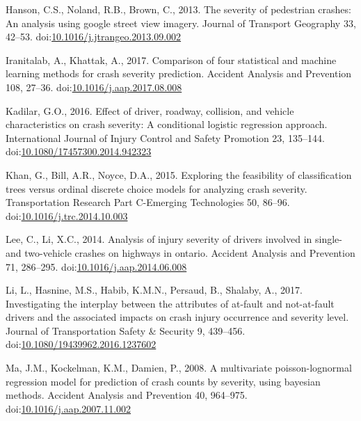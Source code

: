 \documentclass[]{elsarticle} %
\begin{document}
\leavevmode\hypertarget{ref-Hanson2013severity}{}%
Hanson, C.S., Noland, R.B., Brown, C., 2013. The severity of pedestrian
crashes: An analysis using google street view imagery. Journal of
Transport Geography 33, 42--53.
doi:\href{https://doi.org/10.1016/j.jtrangeo.2013.09.002}{10.1016/j.jtrangeo.2013.09.002}

\leavevmode\hypertarget{ref-Iranitalab2017comparison}{}%
Iranitalab, A., Khattak, A., 2017. Comparison of four statistical and
machine learning methods for crash severity prediction. Accident
Analysis and Prevention 108, 27--36.
doi:\href{https://doi.org/10.1016/j.aap.2017.08.008}{10.1016/j.aap.2017.08.008}

\leavevmode\hypertarget{ref-Kadilar2016effect}{}%
Kadilar, G.O., 2016. Effect of driver, roadway, collision, and vehicle
characteristics on crash severity: A conditional logistic regression
approach. International Journal of Injury Control and Safety Promotion
23, 135--144.
doi:\href{https://doi.org/10.1080/17457300.2014.942323}{10.1080/17457300.2014.942323}

\leavevmode\hypertarget{ref-Khan2015exploring}{}%
Khan, G., Bill, A.R., Noyce, D.A., 2015. Exploring the feasibility of
classification trees versus ordinal discrete choice models for analyzing
crash severity. Transportation Research Part C-Emerging Technologies 50,
86--96.
doi:\href{https://doi.org/10.1016/j.trc.2014.10.003}{10.1016/j.trc.2014.10.003}

\leavevmode\hypertarget{ref-Lee2014analysis}{}%
Lee, C., Li, X.C., 2014. Analysis of injury severity of drivers involved
in single- and two-vehicle crashes on highways in ontario. Accident
Analysis and Prevention 71, 286--295.
doi:\href{https://doi.org/10.1016/j.aap.2014.06.008}{10.1016/j.aap.2014.06.008}

\leavevmode\hypertarget{ref-Li2017interplay}{}%
Li, L., Hasnine, M.S., Habib, K.M.N., Persaud, B., Shalaby, A., 2017.
Investigating the interplay between the attributes of at-fault and
not-at-fault drivers and the associated impacts on crash injury
occurrence and severity level. Journal of Transportation Safety \&
Security 9, 439--456.
doi:\href{https://doi.org/10.1080/19439962.2016.1237602}{10.1080/19439962.2016.1237602}

\leavevmode\hypertarget{ref-Ma2008multivariate}{}%
Ma, J.M., Kockelman, K.M., Damien, P., 2008. A multivariate
poisson-lognormal regression model for prediction of crash counts by
severity, using bayesian methods. Accident Analysis and Prevention 40,
964--975.
doi:\href{https://doi.org/10.1016/j.aap.2007.11.002}{10.1016/j.aap.2007.11.002}
\end{document}
